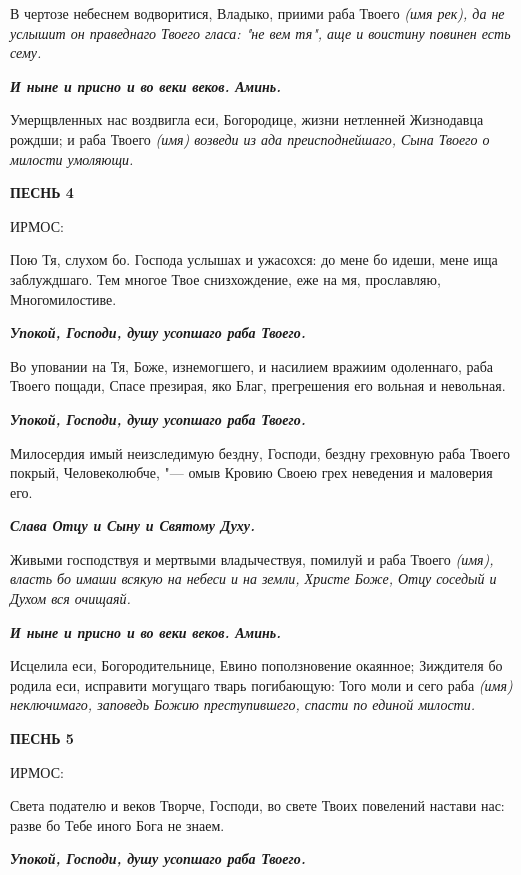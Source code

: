 В чертозе небеснем водворитися, Владыко, приими раба Твоего \itshape (имя рек)\normalfont{}, да не услышит он праведнаго Твоего гласа: "не вем тя", аще и воистину повинен есть сему.


\itshape \bfseries И ныне и присно и во веки веков. Аминь.\normalfont{}\normalfont{}


Умерщвленных нас воздвигла еси, Богородице, жизни нетленней Жизнодавца рождши; и раба Твоего \itshape (имя)\normalfont{} возведи из ада преисподнейшаго, Сына Твоего о милости умоляющи. 


\bfseries ПЕСНЬ 4


ИРМОС:\normalfont{}


Пою Тя, слухом бо. Господа услышах и ужасохся: до мене бо идеши, мене ища заблуждшаго. Тем многое Твое снизхождение, еже на мя, прославляю, Многомилостиве.


\itshape \bfseries Упокой, Господи, душу усопшаго раба Твоего.\normalfont{}\normalfont{}


Во уповании на Тя, Боже, изнемогшего, и насилием вражиим одоленнаго, раба Твоего пощади, Спасе презирая, яко Благ, прегрешения его вольная и невольная.


\itshape \bfseries Упокой, Господи, душу усопшаго раба Твоего.\normalfont{}\normalfont{}


Милосердия имый неизследимую бездну, Господи, бездну греховную раба Твоего покрый, Человеколюбче, "--- омыв Кровию Своею грех неведения и маловерия его.


\itshape \bfseries Слава Отцу и Сыну и Святому Духу.\normalfont{}\normalfont{}


Живыми господствуя и мертвыми владычествуя, помилуй и раба Твоего \itshape (имя)\normalfont{}, власть бо имаши всякую на небеси и на земли, Христе Боже, Отцу соседый и Духом вся очищаяй.


\itshape \bfseries И ныне и присно и во веки веков. Аминь.\normalfont{}\normalfont{}


Исцелила еси, Богородительнице, Евино поползновение окаянное; Зиждителя бо родила еси, исправити могущаго тварь погибающую: Того моли и сего раба \itshape (имя)\normalfont{} неключимаго, заповедь Божию преступившего, спасти по единой милости. 


\bfseries ПЕСНЬ 5


ИРМОС:\normalfont{}


Света подателю и веков Творче, Господи, во свете Твоих повелений настави нас: разве бо Тебе иного Бога не знаем.


\itshape \bfseries Упокой, Господи, душу усопшаго раба Твоего.\normalfont{}\normalfont{}



